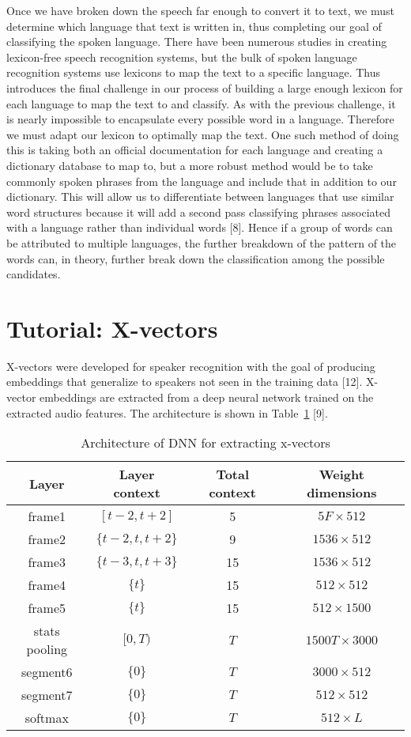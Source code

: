 \documentclass{llncs}
\begin{document}
Once we have broken down the speech far enough to convert it to text, we must determine which language that text is written in, thus completing our goal of classifying the spoken language. There have been numerous studies in creating lexicon-free speech recognition systems, but the bulk of spoken language recognition systems use lexicons to map the text to a specific language. Thus introduces the final challenge in our process of building a large enough lexicon for each language to map the text to and classify. As with the previous challenge, it is nearly impossible to encapsulate every possible word in a language. Therefore we must adapt our lexicon to optimally map the text. One such method of doing this is taking both an official documentation for each language and creating a dictionary database to map to, but a more robust method would be to take commonly spoken phrases from the language and include that in addition to our dictionary. This will allow us to differentiate between languages that use similar word structures because it will add a second pass classifying phrases associated with a language rather than individual words [8]. Hence if a group of words can be attributed to multiple languages, the further breakdown of the pattern of the words can, in theory, further break down the classification among the possible candidates.

\section{Tutorial: X-vectors}

X-vectors were developed for speaker recognition with the goal of producing embeddings that generalize to speakers not seen in the training data [12]. X-vector embeddings are extracted from a deep neural network trained on the extracted audio features. The architecture is shown in Table~\ref{table1} [9].

\begin{table}
\caption{Architecture of DNN for extracting x-vectors}\label{table1}
\begin{center}
\begin{tabular}{ c c c c }
\toprule
Layer & Layer context & Total context & Weight dimensions \\
\midrule
frame1 & $[t-2,t+2]$ & 5 & $5F\times512$ \\
frame2 & $\{t-2, t, t+2\}$ & 9 & $1536\times512$ \\
frame3 & $\{t-3, t, t+3\}$ & 15 & $1536\times512$ \\
frame4 & $\{t\}$ & 15 & $512\times512$ \\
frame5 & $\{t\}$ & 15 & $512\times1500$ \\
stats pooling & $[0, T)$ & $T$ & $1500T\times3000$ \\
segment6 & $\{0\}$ & $T$ & $3000\times512$ \\
segment7 & $\{0\}$ & $T$ & $512\times512$ \\
softmax & $\{0\}$ & $T$ & $512\times L$ \\
\bottomrule
\end{tabular}
\end{center}
\end{table}
\end{document}
